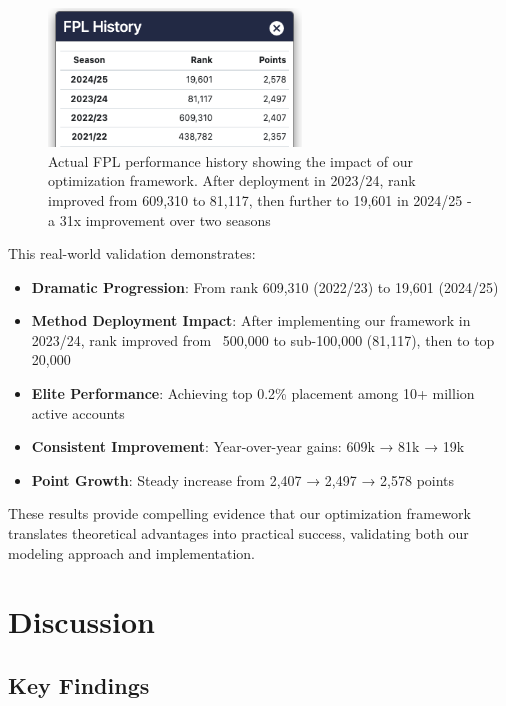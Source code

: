 \documentclass[12pt]{article}
\begin{document}
\begin{figure}[H]
\centering
\includegraphics[width=0.6\textwidth]{../images/fpl_history.png}
\caption{Actual FPL performance history showing the impact of our optimization framework. After deployment in 2023/24, rank improved from 609,310 to 81,117, then further to 19,601 in 2024/25 - a 31x improvement over two seasons}
\end{figure}

This real-world validation demonstrates:
\begin{itemize}
\item \textbf{Dramatic Progression}: From rank 609,310 (2022/23) to 19,601 (2024/25)
\item \textbf{Method Deployment Impact}: After implementing our framework in 2023/24, rank improved from ~500,000 to sub-100,000 (81,117), then to top 20,000
\item \textbf{Elite Performance}: Achieving top 0.2\% placement among 10+ million active accounts
\item \textbf{Consistent Improvement}: Year-over-year gains: 609k → 81k → 19k
\item \textbf{Point Growth}: Steady increase from 2,407 → 2,497 → 2,578 points
\end{itemize}

These results provide compelling evidence that our optimization framework translates theoretical advantages into practical success, validating both our modeling approach and implementation.

\section{Discussion}

\subsection{Key Findings}
\end{document}
